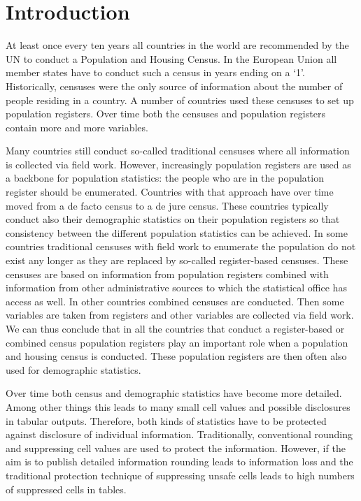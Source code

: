 \chapter{Introduction}\label{ch:intro}

At least once every ten years all countries in the world are recommended by the UN to conduct a Population and Housing Census. In the European Union all member states have to conduct such a census in years ending on a ‘1’. Historically, censuses were the only source of information about the number of people residing in a country. A number of countries used these censuses to set up population registers. Over time both the censuses and population registers contain more and more variables.


Many countries still conduct so-called traditional censuses where all information is collected via field work. However, increasingly population registers are used as a backbone for population statistics: the people who are in the population register should be enumerated. Countries with that approach have over time moved from a de facto census to a de jure census. These countries typically conduct also their demographic statistics on their population registers so that consistency between the different population statistics can be achieved. In some countries traditional censuses with field work to enumerate the population do not exist any longer as they are replaced by so-called register-based censuses. These censuses are based on information from population registers combined with information from other administrative sources to which the statistical office has access as well. In other countries combined censuses are conducted. Then some variables are taken from registers and other variables are collected via field work. We can thus conclude that in all the countries that conduct a register-based or combined census population registers play an important role when a population and housing census is conducted. These population registers are then often also used for demographic statistics.


Over time both census and demographic   statistics have become more detailed. Among other things this leads to many small cell values and possible disclosures in tabular outputs. Therefore, both kinds of statistics have to be protected against disclosure of individual information. Traditionally, conventional rounding and suppressing cell values are used to protect the information. However, if the aim is to publish detailed information rounding leads to information loss and the traditional protection technique of suppressing unsafe cells leads to high numbers of suppressed cells in tables.


